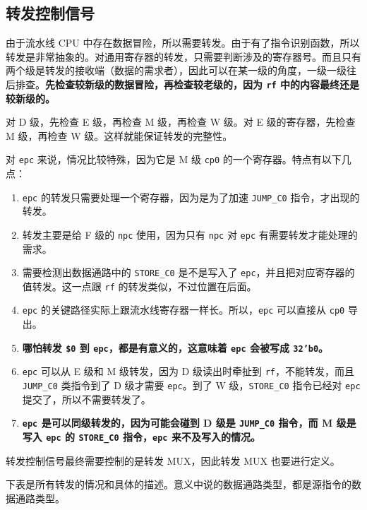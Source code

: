 \documentclass[12pt,AutoFakeBold,AutoFakeSlant]{article}
\providecommand{\tightlist}{%
  \setlength{\itemsep}{0pt}\setlength{\parskip}{0pt}}
\newcommand{\ms}[1]{\texttt{#1}}
\begin{document}
\hypertarget{ux8f6cux53d1ux63a7ux5236ux4fe1ux53f7}{%
\subsection{转发控制信号}\label{ux8f6cux53d1ux63a7ux5236ux4fe1ux53f7}}

由于流水线 CPU 中存在数据冒险，所以需要转发。由于有了指令识别函数，所以转发是非常抽象的。对通用寄存器的转发，只需要判断涉及的寄存器号。而且只有两个级是转发的接收端（数据的需求者），因此可以在某一级的角度，一级一级往后排查。\textbf{先检查较新级的数据冒险，再检查较老级的，因为 \texttt{rf}
中的内容最终还是较新级的。}

对 D 级，先检查 E 级，再检查 M 级，再检查 W 级。对 E 级的寄存器，先检查
M 级，再检查 W 级。这样就能保证转发的完整性。

对 \ms{epc} 来说，情况比较特殊，因为它是 M 级 \ms{cp0} 的一个寄存器。特点有以下几点：

\begin{enumerate}
\tightlist
\item
\ms{epc} 的转发只需要处理一个寄存器，因为是为了加速 \ms{JUMP\_C0} 指令，才出现的转发。
\item
转发主要是给 F 级的 \ms{npc} 使用，因为只有 \ms{npc} 对 \ms{epc} 有需要转发才能处理的需求。
\item
需要检测出数据通路中的 \ms{STORE\_C0} 是不是写入了 \ms{epc}，并且把对应寄存器的值转发。这一点跟 \ms{rf} 的转发类似，不过位置在后面。
\item
\ms{epc} 的关键路径实际上跟流水线寄存器一样长。所以，\ms{epc} 可以直接从 \ms{cp0} 导出。
\item
\textbf{哪怕转发 \ms{\$0} 到 \ms{epc}，都是有意义的，这意味着 \ms{epc} 会被写成 \ms{32'b0}。}
\item
\ms{epc} 可以从 E 级和 M 级转发，因为 D 级读出时牵扯到 \ms{rf}，不能转发，而且 \ms{JUMP\_C0} 类指令到了 D 级才需要 \ms{epc}。到了 W 级，\ms{STORE\_C0} 指令已经对 \ms{epc} 提交了，所以不需要转发了。
\item
\textbf{\ms{epc} 是可以同级转发的，因为可能会碰到 D 级是 \ms{JUMP\_C0} 指令，而 M 级是写入 \ms{epc} 的 \ms{STORE\_C0} 指令，\ms{epc} 来不及写入的情况。}
\end{enumerate}

转发控制信号最终需要控制的是转发 MUX，因此转发 MUX 也要进行定义。

下表是所有转发的情况和具体的描述。意义中说的数据通路类型，都是源指令的数据通路类型。
\end{document}
